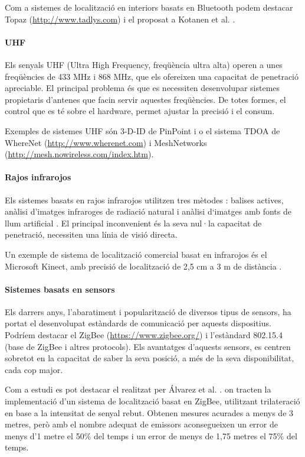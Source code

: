 Com a sistemes de localització en interiors basats en Bluetooth podem destacar Topaz (\url{http://www.tadlys.com}) i el proposat a Kotanen et al. \cite{kotanen}.

\paragraph{UHF}

Els senyals UHF (Ultra High Frequency, freqüència ultra alta) operen a unes freqüències de 433 MHz i 868 MHz, que els ofereixen una capacitat de penetració apreciable. El principal problema és que es necessiten desenvolupar sistemes propietaris d'antenes que facin servir aquestes freqüències. De totes formes, el control que es té sobre el hardware, permet ajustar la precisió i el consum.

Exemples de sistemes UHF són 3-D-ID de PinPoint \cite{werb} i o el sistema TDOA de WhereNet (\url{http://www.wherenet.com}) i MeshNetworks (\url{http://mesh.nowireless.com/index.htm}).

\paragraph{Rajos infrarojos}

Els sistemes basats en rajos infrarojos utilitzen tres mètodes \cite{chan}: balises actives, anàlisi d’imatges infraroges de radiació natural i anàlisi d‘imatges amb fonts de llum artificial \cite{mautz}. El principal inconvenient és la seva nul·la capacitat de penetració, necessiten una línia de visió directa.

Un exemple de sistema de localització comercial basat en infrarojos és el Microsoft Kinect, amb precisió de localització de 2,5 cm a 3 m de distància \cite{khoshelham}.

\paragraph{Sistemes basats en sensors}

Els darrers anys, l'abaratiment i popularització de diversos tipus de sensors, ha portat el desenvolupat estàndards de comunicació per aquests dispositius. Podríem destacar el ZigBee (\url{https://www.zigbee.org/}) i l'estàndard 802.15.4 (base de ZigBee i altres protocols). Els avantatges d'aquests sensors, es centren sobretot en la capacitat de saber la seva posició, a més de la seva disponibilitat, cada cop major.

Com a estudi es pot destacar el realitzat per Álvarez et al. \cite{alvarez}. on tracten la implementació d’un sistema de localització basat en ZigBee, utilitzant trilateració en base a la intensitat de senyal rebut. Obtenen mesures acurades a menys de 3 metres, però amb el nombre adequat de emissors aconsegueixen un error de menys d’1 metre el 50\% del temps i un error de menys de 1,75 metres el 75\% del temps.

